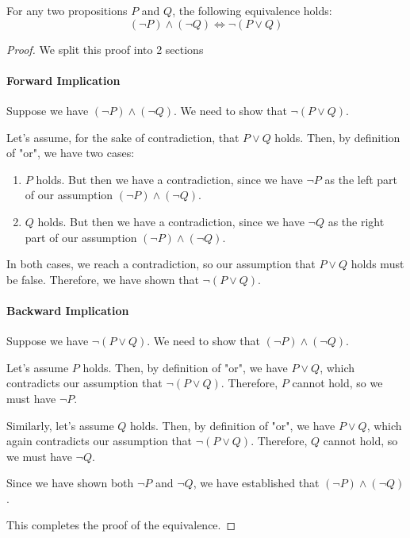 \begin{Exercise}
For any two propositions $P$ and $Q$, the following equivalence holds:
$$(\neg P) \land (\neg Q) \iff \neg (P \lor Q)$$
\end{Exercise}
\begin{Answer}
\begin{proof}
We split this proof into 2 sections
\paragraph*{Forward Implication}
Suppose we have $(\neg P) \land (\neg Q)$. We need to show that $\neg (P \lor Q)$.

Let's assume, for the sake of contradiction, that $P \lor Q$ holds. Then, by definition of "or", we have two cases:

\begin{enumerate}
\item $P$ holds. But then we have a contradiction, since we have $\neg P$ as the left part of our assumption  $(\neg P) \land (\neg Q)$.
\item $Q$ holds. But then we have a contradiction, since we have $\neg Q$ as the right part of our assumption  $(\neg P) \land (\neg Q)$.
\end{enumerate}

In both cases, we reach a contradiction, so our assumption that $P \lor Q$ holds must be false. Therefore, we have shown that $\neg (P \lor Q)$.

\paragraph*{Backward Implication}
Suppose we have $\neg (P \lor Q)$. We need to show that $(\neg P) \land (\neg Q)$.

Let's assume $P$ holds. Then, by definition of "or", we have $P \lor Q$, which contradicts our assumption that $\neg (P \lor Q)$. Therefore, $P$ cannot hold, so we must have $\neg P$.

Similarly, let's assume $Q$ holds. Then, by definition of "or", we have $P \lor Q$, which again contradicts our assumption that $\neg (P \lor Q)$. Therefore, $Q$ cannot hold, so we must have $\neg Q$.

Since we have shown both $\neg P$ and $\neg Q$, we have established that $(\neg P) \land (\neg Q)$.

This completes the proof of the equivalence.
\end{proof}
\end{Answer}

